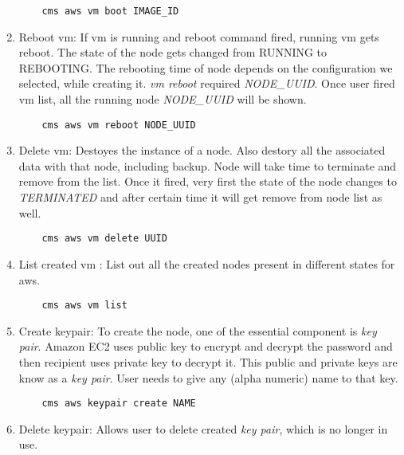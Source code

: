 \documentclass[9pt,twocolumn,twoside]{../../styles/osajnl}
\begin{document}
\begin{enumerate}
    \begin{verbatim}
    cms aws vm boot IMAGE_ID
    \end{verbatim}
    
    \item Reboot vm: If vm is running and reboot command fired, running vm gets reboot. The state of the node gets changed from RUNNING to 	REBOOTING. The rebooting time of node depends on the configuration we selected, while creating it. \textit{vm reboot} required \textit{NODE\_UUID}. Once user fired vm list, all the running node \textit{NODE\_UUID} will be shown.
    
    \begin{verbatim}
    cms aws vm reboot NODE_UUID
    \end{verbatim}
    
    \item Delete vm: Destoyes the instance of a node. Also destory all the associated data with that node, including backup. Node will take time to terminate and remove from the list. Once it fired, very first the state of the node changes to \textit{TERMINATED} and after certain time it will get remove from node list as well. 
    
    \begin{verbatim}
    cms aws vm delete UUID
    \end{verbatim}
    
    \item List created vm : List out all the created nodes present in different states for aws.
    
    \begin{verbatim}
    cms aws vm list
    \end{verbatim}
    
    \item Create keypair: To create the node, one of the essential component is \textit{key pair}. Amazon EC2 uses public key to encrypt and decrypt the password and then recipient uses private key to decrypt it. This public and private keys are know as a \textit{key pair}. User needs to give any (alpha numeric) name to that key.
    
    \begin{verbatim}
    cms aws keypair create NAME
    \end{verbatim}
    
    \item Delete keypair: Allows user to delete created \textit{key pair}, which is no longer in use.
    

\end{enumerate}
\end{document}
